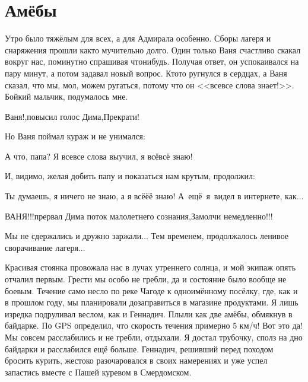 \chapter{Амёбы} 

Утро было тяжёлым для всех, а для Адмирала особенно. Сборы лагеря и снаряжения прошли как\sdash то мучительно долго. Один только Ваня счастливо скакал вокруг нас, поминутно спрашивая что\sdash нибудь. Получая ответ, он успокаивался на пару минут, а потом задавал новый вопрос. Кто\sdash то ругнулся в сердцах, а Ваня сказал, что мы, мол, можем ругаться, потому что он <<все\sdash все слова знает!>>. Бойкий мальчик, подумалось мне. 


\diagdash Ваня!,\mdash повысил голос Дима,\mdash Прекрати! 

Но Ваня поймал кураж и не унимался: 

\diagdash А что, папа? Я все\sdash все слова выучил, я всё\sdash всё знаю! 

И, видимо, желая добить папу и показаться нам крутым, продолжил: 

\diagdash Ты думаешь, я ничего не знаю, а я всё\sdash ё\sdash ё знаю! А~ещё~я~видел в интернете, как$\ldots$ 

\diagdash ВАНЯ!!!\mdash прервал Дима поток малолетнего сознания,\mdash Замолчи немедленно!!! 

Мы не сдержались и  дружно заржали$\ldots$ Тем временем, продолжалось ленивое сворачивание лагеря$\ldots$ 

Красивая стоянка провожала нас в лучах утреннего солнца, и мой экипаж опять отчалил первым. Грести мы особо не гребли, да и состояние было вообще не боевым. Течение само несло по реке Чагоде к одноимённому посёлку, где, как и в прошлом году, мы планировали дозаправиться в магазине продуктами. Я лишь изредка подруливал веслом, как и Геннадич. Плыли как две амёбы, обмякнув в байдарке. По GPS определил, что скорость течения примерно 5 км/ч! Вот это да! Мы совсем расслабились и не гребли, отдыхали. Я достал трубочку, сполз на дно байдарки и расслабился ещё больше. Геннадич, решивший перед походом бросить курить, жестоко разочаровался в своих намерениях и уже успел запастись вместе с Пашей куревом в Смердомском.

